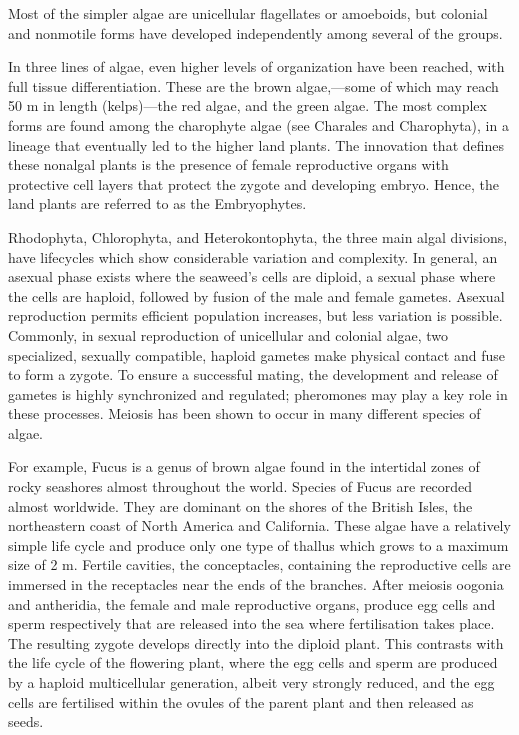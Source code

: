 Most of the simpler algae are unicellular flagellates or amoeboids, but colonial and nonmotile forms have developed independently among several of the groups.

In three lines of algae, even higher levels of organization have been reached, with full tissue differentiation. These are the brown algae,---some of which may reach 50 m in length (kelps)---the red algae, and the green algae. The most complex forms are found among the charophyte algae (see Charales and Charophyta), in a lineage that eventually led to the higher land plants. The innovation that defines these nonalgal plants is the presence of female reproductive organs with protective cell layers that protect the zygote and developing embryo. Hence, the land plants are referred to as the Embryophytes.

Rhodophyta, Chlorophyta, and Heterokontophyta, the three main algal divisions, have lifecycles which show considerable variation and complexity. In general, an asexual phase exists where the seaweed's cells are diploid, a sexual phase where the cells are haploid, followed by fusion of the male and female gametes. Asexual reproduction permits efficient population increases, but less variation is possible. Commonly, in sexual reproduction of unicellular and colonial algae, two specialized, sexually compatible, haploid gametes make physical contact and fuse to form a zygote. To ensure a successful mating, the development and release of gametes is highly synchronized and regulated; pheromones may play a key role in these processes. Meiosis has been shown to occur in many different species of algae.

For example, Fucus is a genus of brown algae found in the intertidal zones of rocky seashores almost throughout the world. Species of Fucus are recorded almost worldwide. They are dominant on the shores of the British Isles, the northeastern coast of North America and California. These algae have a relatively simple life cycle and produce only one type of thallus which grows to a maximum size of 2 m. Fertile cavities, the conceptacles, containing the reproductive cells are immersed in the receptacles near the ends of the branches. After meiosis oogonia and antheridia, the female and male reproductive organs, produce egg cells and sperm respectively that are released into the sea where fertilisation takes place. The resulting zygote develops directly into the diploid plant. This contrasts with the life cycle of the flowering plant, where the egg cells and sperm are produced by a haploid multicellular generation, albeit very strongly reduced, and the egg cells are fertilised within the ovules of the parent plant and then released as seeds.


